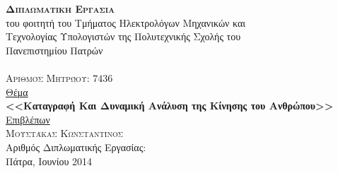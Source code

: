 \hfill
{}
\noindent\makebox[\textwidth]{\rule{\textwidth}{0.4pt}}

\vspace{1.5cm}

\begin{center}
    {\Huge\textsc{\textbf{Διπλωματικη Εργασια}}}\\
    {\Large του φοιτητή του Τμήματος Ηλεκτρολόγων Μηχανικών και\\
    Τεχνολογίας Υπολογιστών της Πολυτεχνικής Σχολής του\\
    Πανεπιστημίου Πατρών}\\[2cm]
    {\Large\textsc{}}\\[10pt]
    {\Large\textsc{Αριθμός Μητρώου: $7436$}}\\[1.5cm]
    {\Large \uline{Θέμα}}\\[10pt]
    {\Large\textbf{<<Καταγραφή Και Δυναμική Ανάλυση της Κίνησης του Ανθρώπου>>}}\\[2cm]
    {\Large \uline{Επιβλέπων}}\\[10pt]
    {\Large\textsc{Μουστάκας Κωνσταντίνος}}\\[2cm]
    {\Large Αριθμός Διπλωματικής Εργασίας:}\\[2cm]
    {\Large{Πάτρα, Ιουνίου 2014}}
\end{center}

